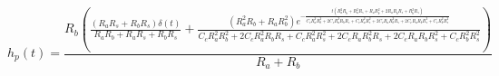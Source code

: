 \begin{equation}
h_{p}{\left(t \right)} = \frac{R_{b} \left(\frac{\left(R_{a} R_{s} + R_{b} R_{s}\right) \delta\left(t\right)}{R_{a} R_{b} + R_{a} R_{s} + R_{b} R_{s}} + \frac{\left(R_{a}^{2} R_{b} + R_{a} R_{b}^{2}\right) e^{- \frac{t \left(R_{a}^{2} R_{b} + R_{a}^{2} R_{s} + R_{a} R_{b}^{2} + 2 R_{a} R_{b} R_{s} + R_{b}^{2} R_{s}\right)}{C_{c} R_{a}^{2} R_{b}^{2} + 2 C_{c} R_{a}^{2} R_{b} R_{s} + C_{c} R_{a}^{2} R_{s}^{2} + 2 C_{c} R_{a} R_{b}^{2} R_{s} + 2 C_{c} R_{a} R_{b} R_{s}^{2} + C_{c} R_{b}^{2} R_{s}^{2}}}}{C_{c} R_{a}^{2} R_{b}^{2} + 2 C_{c} R_{a}^{2} R_{b} R_{s} + C_{c} R_{a}^{2} R_{s}^{2} + 2 C_{c} R_{a} R_{b}^{2} R_{s} + 2 C_{c} R_{a} R_{b} R_{s}^{2} + C_{c} R_{b}^{2} R_{s}^{2}}\right)}{R_{a} + R_{b}}
\end{equation}

